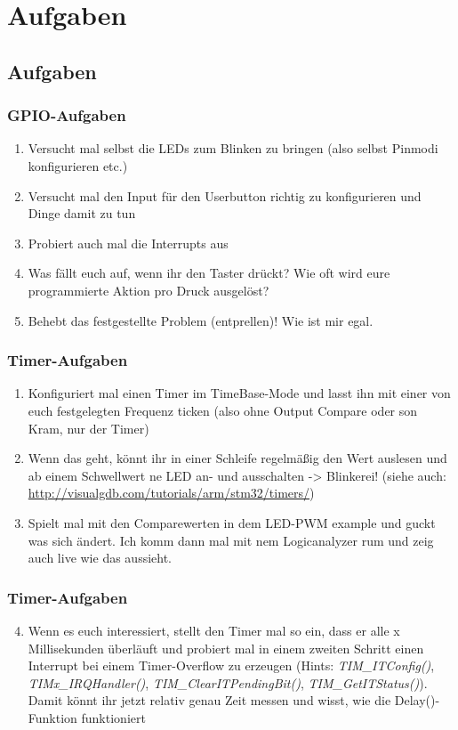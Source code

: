 \documentclass[ngerman,compress]{beamer}
\begin{document}
\section{Aufgaben}
\subsection{Aufgaben}
\begin{frame}
	\frametitle{GPIO-Aufgaben}
	\begin{enumerate}
		\item Versucht mal selbst die LEDs zum Blinken zu bringen (also selbst Pinmodi konfigurieren etc.)
		\item Versucht mal den Input für den Userbutton richtig zu konfigurieren und Dinge damit zu tun
		\item Probiert auch mal die Interrupts aus
		\item Was fällt euch auf, wenn ihr den Taster drückt? Wie oft wird eure programmierte Aktion pro Druck ausgelöst?
		\item Behebt das festgestellte Problem (entprellen)! Wie ist mir egal.
	\end{enumerate}
\end{frame}

\begin{frame}
	\frametitle{Timer-Aufgaben}
	\begin{enumerate}
		\item Konfiguriert mal einen Timer im TimeBase-Mode und lasst ihn mit einer von euch festgelegten Frequenz ticken (also ohne Output Compare oder son Kram, nur der Timer)
		\item Wenn das geht, könnt ihr in einer Schleife regelmäßig den Wert auslesen und ab einem Schwellwert ne LED an- und ausschalten -> Blinkerei! (siehe auch: \url{http://visualgdb.com/tutorials/arm/stm32/timers/})
		\item Spielt mal mit den Comparewerten in dem LED-PWM example und guckt was sich ändert. Ich komm dann mal mit nem Logicanalyzer rum und zeig auch live wie das aussieht.
	\end{enumerate}
\end{frame}

\begin{frame}
	\frametitle{Timer-Aufgaben}
	\begin{enumerate}
		\setcounter{enumi}{3}
		\item Wenn es euch interessiert, stellt den Timer mal so ein, dass er alle x Millisekunden überläuft und probiert mal in einem zweiten Schritt einen Interrupt bei einem Timer-Overflow zu erzeugen (Hints: \emph{TIM\_ITConfig()}, \emph{TIMx\_IRQHandler()}, \emph{TIM\_ClearITPendingBit()}, \emph{TIM\_GetITStatus()}). Damit könnt ihr jetzt relativ genau Zeit messen und wisst, wie die Delay()-Funktion funktioniert
	\end{enumerate}
\end{frame}
\end{document}

